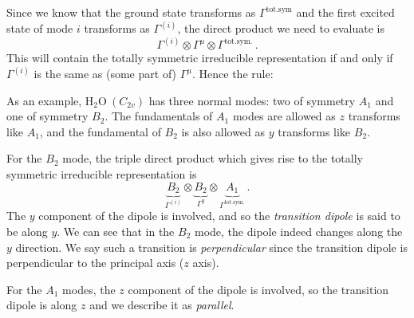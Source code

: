 \documentclass{article}
\theoremstyle{plain}\theoremheaderfont{\normalfont\itshape}\theorembodyfont{\rmfamily}\theoremseparator{.}\newtheorem*{rem}{Remark}\newtheorem*{ex}{Example}\newtheorem*{proof}{Proof}\newtheorem*{altp}{Alternative proof}
\theoremstyle{plain}\theoremheaderfont{\normalfont\bfseries}\theorembodyfont{\rmfamily}\theoremseparator{.}\newtheorem{thm}{Theorem}[section]\newtheorem{lem}[thm]{Lemma}\newtheorem{prop}[thm]{Proposition}\newtheorem*{cor}{Corollary}\newtheorem{defn}[thm]{Definition}\newtheorem{clm}[thm]{Claim}\newtheorem{clminproof}{Claim}\newtheorem{pos}{Postulate}[section]
\theoremstyle{break}\theoremheaderfont{\normalfont\itshape}\theorembodyfont{\rmfamily}\theoremseparator{.\medskip}\newtheorem*{proofskip}{Proof}\newtheorem*{exs}{Examples}\newtheorem*{rems}{Remarks}
\theoremstyle{break}\theoremheaderfont{\normalfont\bfseries}\theorembodyfont{\rmfamily}\theoremseparator{.\medskip}\newtheorem{lemskip}[thm]{Lemma}\newtheorem{defnskip}[thm]{Definition}\newtheorem{propskip}[thm]{Proposition}\newtheorem{thmskip}[thm]{Theorem}
\numberwithin{equation}{section}
\begin{document}
    Since we know that the ground state transforms as \(\Gamma^{\text{tot.sym}}\) and the first excited state of mode \(i\) transforms as \(\Gamma^{(i)}\), the direct product we need to evaluate is
    \begin{equation}
        \Gamma^{(i)}\otimes\Gamma^\mu\otimes\Gamma^{\text{tot.sym.}}\,.
    \end{equation}
    This will contain the totally symmetric irreducible representation if and only if \(\Gamma^{(i)}\) is the same as (some part of) \(\Gamma^\mu\). Hence the rule:


    As an example, \(\mathrm{H_2O}\ (C_{2v})\) has three normal modes: two of symmetry \(A_1\) and one of symmetry \(B_2\). The fundamentals of \(A_1\) modes are allowed as \(z\) transforms like \(A_1\), and the fundamental of \(B_2\) is also allowed as \(y\) transforms like \(B_2\).

    For the \(B_2\) mode, the triple direct product which gives rise to the totally symmetric irreducible representation is
    \begin{equation}
        \underbrace{B_2}_{\Gamma^{(i)}}\otimes\underbrace{B_2}_{\Gamma^y}\otimes\underbrace{A_1}_{\Gamma^{\text{tot.sym.}}}\,.
    \end{equation}
    The \(y\) component of the dipole is involved, and so the \textit{transition dipole} is said to be along \(y\). We can see that in the \(B_2\) mode, the dipole indeed changes along the \(y\) direction. We say such a transition is \textit{perpendicular} since the transition dipole is perpendicular to the principal axis (\(z\) axis).

    For the \(A_1\) modes, the \(z\) component of the dipole is involved, so the transition dipole is along \(z\) and we describe it as \textit{parallel}.
\end{document}

